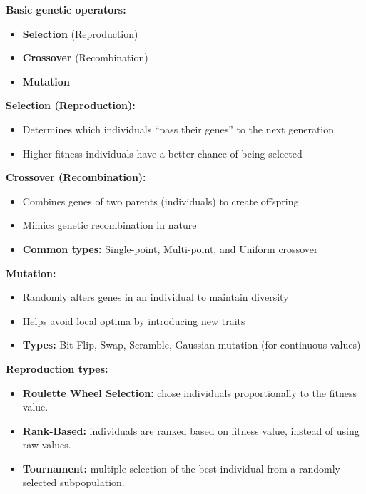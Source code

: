 \documentclass[11pt]{article}
\begin{document}
    \break

    \textbf{Basic genetic operators:}
    \begin{itemize}
        \item \textbf{Selection} (Reproduction)
        \item \textbf{Crossover} (Recombination)
        \item \textbf{Mutation}\\
    \end{itemize}

    \textbf{Selection (Reproduction):}
    \begin{itemize}
        \item Determines which individuals “pass their genes” to the next generation
        \item Higher fitness individuals have a better chance of being selected\\
    \end{itemize}

    \textbf{Crossover (Recombination):}
    \begin{itemize}
        \item Combines genes of two parents (individuals) to create offspring
        \item Mimics genetic recombination in nature
        \item \textbf{Common types:} Single-point, Multi-point, and Uniform crossover\\
    \end{itemize}

    \textbf{Mutation:}
    \begin{itemize}
        \item Randomly alters genes in an individual to maintain diversity
        \item Helps avoid local optima by introducing new traits
        \item \textbf{Types:} Bit Flip, Swap, Scramble, Gaussian mutation (for continuous values)\\
    \end{itemize}

    \textbf{Reproduction types:}
    \begin{itemize}
        \item \textbf{Roulette Wheel Selection:} chose individuals proportionally to the fitness value.
        \item \textbf{Rank-Based:} individuals are ranked based on fitness value, instead of using raw values.
        \item \textbf{Tournament:} multiple selection of the best individual from a randomly selected subpopulation.\\
    \end{itemize}
\end{document}
